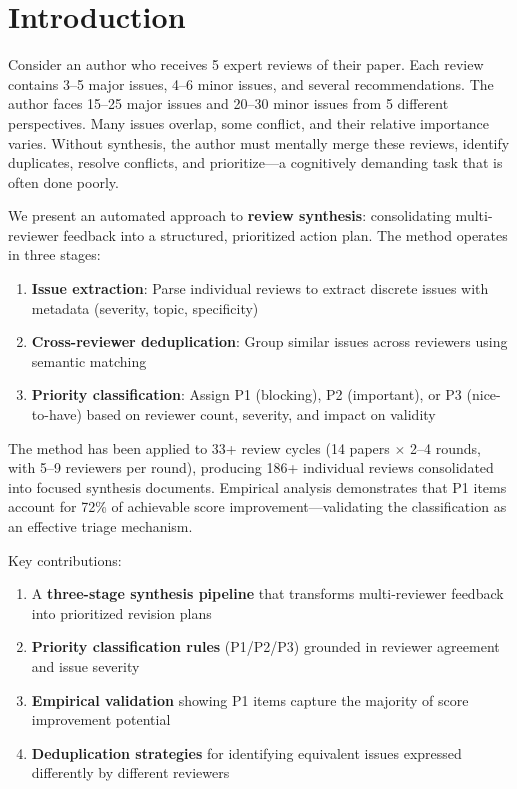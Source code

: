 \section{Introduction}

Consider an author who receives 5 expert reviews of their paper. Each review contains 3--5 major issues, 4--6 minor issues, and several recommendations. The author faces 15--25 major issues and 20--30 minor issues from 5 different perspectives. Many issues overlap, some conflict, and their relative importance varies. Without synthesis, the author must mentally merge these reviews, identify duplicates, resolve conflicts, and prioritize---a cognitively demanding task that is often done poorly.

We present an automated approach to \textbf{review synthesis}: consolidating multi-reviewer feedback into a structured, prioritized action plan. The method operates in three stages:

\begin{enumerate}
    \item \textbf{Issue extraction}: Parse individual reviews to extract discrete issues with metadata (severity, topic, specificity)
    \item \textbf{Cross-reviewer deduplication}: Group similar issues across reviewers using semantic matching
    \item \textbf{Priority classification}: Assign P1 (blocking), P2 (important), or P3 (nice-to-have) based on reviewer count, severity, and impact on validity
\end{enumerate}

The method has been applied to 33+ review cycles (14 papers $\times$ 2--4 rounds, with 5--9 reviewers per round), producing 186+ individual reviews consolidated into focused synthesis documents. Empirical analysis demonstrates that P1 items account for 72\% of achievable score improvement---validating the classification as an effective triage mechanism.

\noindent Key contributions:
\begin{enumerate}
    \item A \textbf{three-stage synthesis pipeline} that transforms multi-reviewer feedback into prioritized revision plans
    \item \textbf{Priority classification rules} (P1/P2/P3) grounded in reviewer agreement and issue severity
    \item \textbf{Empirical validation} showing P1 items capture the majority of score improvement potential
    \item \textbf{Deduplication strategies} for identifying equivalent issues expressed differently by different reviewers
\end{enumerate}
